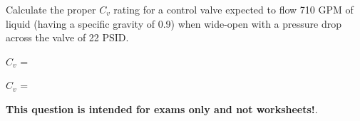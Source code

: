 

Calculate the proper $C_v$ rating for a control valve expected to flow 710 GPM of liquid (having a specific gravity of 0.9) when wide-open with a pressure drop across the valve of 22 PSID.

\vskip 10pt

$C_v$ = \underbar{\hskip 50pt}







$C_v$ = 







{\bf This question is intended for exams only and not worksheets!}.




